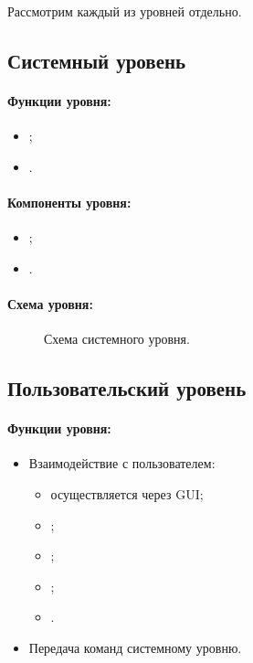 \documentclass[12pt,a4paper,fullpage,titlepage]{article}
\begin{document}
Рассмотрим каждый из уровней отдельно.


\newpage
\subsection{Системный уровень}

\paragraph{Функции уровня:}
\begin{itemize}
	\item ;
	\item .\\
\end{itemize}

\paragraph{Компоненты уровня:}
\begin{itemize}
	\item ;
	\item .\\
\end{itemize}

\paragraph{Схема уровня:}

\begin{figure}[thbp!]
	\centering
	
	\caption{Схема системного уровня.}
\end{figure}

\newpage
\subsection{Пользовательский уровень}

\paragraph{Функции уровня:}
\begin{itemize}
	\item Взаимодействие с пользователем:
	\begin{itemize}
		\item осуществляется через GUI;
		\item ;
		\item ;
		\item ;
		\item .
	\end{itemize}
	\item Передача команд системному уровню.\\
\end{itemize}
\end{document}
